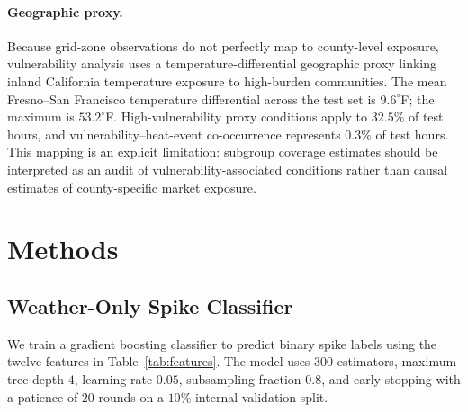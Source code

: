 \documentclass{article}
\begin{document}
\paragraph{Geographic proxy.}
Because grid-zone observations do not perfectly map to county-level exposure,
vulnerability analysis uses a temperature-differential geographic proxy
linking inland California temperature exposure to high-burden communities.
The mean Fresno--San Francisco temperature differential across the test set
is $9.6^{\circ}$F; the maximum is $53.2^{\circ}$F. High-vulnerability proxy
conditions apply to $32.5\%$ of test hours, and vulnerability--heat-event
co-occurrence represents $0.3\%$ of test hours. This mapping is an explicit
limitation: subgroup coverage estimates should be interpreted as an audit
of vulnerability-associated conditions rather than causal estimates of
county-specific market exposure.

\section{Methods}
\label{sec:methods}

\subsection{Weather-Only Spike Classifier}

We train a gradient boosting classifier \citep{friedman2001} to predict
binary spike labels using the twelve features in Table~\ref{tab:features}.
The model uses $300$ estimators, maximum tree depth $4$, learning rate
$0.05$, subsampling fraction $0.8$, and early stopping with a patience of
$20$ rounds on a $10\%$ internal validation split.
\end{document}
